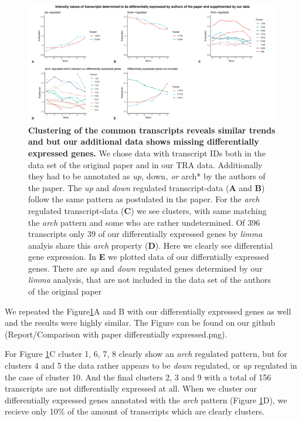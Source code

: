 \documentclass[
]{article}
\begin{document}
\begin{figure}
\centering
\includegraphics{final_report_files/figure-latex/paper-trends-cluster-1.pdf}
\caption{\label{fig:paper-trends-cluster}\textbf{Clustering of the common transcripts reveals similar trends and but our additional data shows missing differentially expressed genes.} We chose data with transcript IDs both in the data set of the original paper and in our TRA data. Additionally they had to be annotated as \emph{up, }down\emph{, or }arch* by the authors of the paper. The \emph{up} and \emph{down} regulated transcript-data (\textbf{A} and \textbf{B}) follow the same pattern as postulated in the paper. For the \emph{arch} regulated transcript-data (\textbf{C}) we see clusters, with same matching the \emph{arch} pattern and some who are rather undetermined. Of 396 transcripts only 39 of our differentially expressed genes by \emph{limma} analyis share this \emph{arch} property (\textbf{D}). Here we clearly see differential gene expression. In \textbf{E} we plotted data of our differntially expressed genes. There are \emph{up} and \emph{down} regulated genes determined by our \emph{limma} analysis, that are not included in the data set of the authors of the original paper}
\end{figure}

We repeated the Figure\ref{fig:paper-trends-cluster}A and B with our differentially expressed genes as well and the results were highly similar. The Figure can be found on our github (Report/Comparison with paper differentially expressed.png).

For Figure \ref{fig:paper-trends-cluster}C cluster 1, 6, 7, 8 clearly show an \emph{arch} regulated pattern, but for clusters 4 and 5 the data rather appears to be \emph{down} regulated, or \emph{up} regulated in the case of cluster 10. And the final clusters 2, 3 and 9 with a total of 156 transcripts are not differentially expressed at all. When we cluster our differentially expressed genes annotated with the \emph{arch} pattern (Figure \ref{fig:paper-trends-cluster}D), we recieve only 10\% of the amount of transcripts which are clearly clusters.
\end{document}
